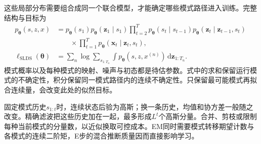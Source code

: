这些局部分布需要组合成同一个联合模型，才能确定哪些模式路径进入训练。完整结构与目标为
\begin{equation}
  \begin{aligned}
    p_{\bm\theta}(s,z,x)
      &=p_{\bm\theta}(s_1)p_{\bm\theta}(\bm z_1\mid s_1)
        \prod_{t=2}^{T}p_{\bm\theta}(s_t\mid s_{t-1})
                           p_{\bm\theta}(\bm z_t\mid\bm z_{t-1},s_t)\\
      &\qquad{}\times\prod_{t=1}^{T}
                           p_{\bm\theta}(\bm x_t\mid\bm z_t,s_t),\\
    \ell_{\mathrm{SLDS}}(\bm\theta)
      &=\sum_n\log\sum_{s_{1:T_n}}\int
                   p_{\bm\theta}(s,z,x^{(n)})\,\mathrm d\bm z_{1:T_n}.
  \end{aligned}
  \label{eq:pgm-dynamic-switching-objective}
\end{equation}
模式概率以及每种模式的映射、噪声与初态都是待估参数。式中的求和保留运行模式的不确定性，积分保留同一模式路径内的连续不确定性。只保留最可能模式再拟合连续量，会改变此处的似然目标。

固定模式历史$s_{1:t}$时，连续状态后验为高斯；换一条历史，均值和协方差一般随之改变。精确滤波把这些历史加在一起，最多形成$L^t$个高斯分量。合并、剪枝或限制每种当前模式的分量数，以近似换取可控成本。EM同时需要模式转移期望计数与各模式的连续二阶矩，E步的混合推断质量因而直接影响学习。

